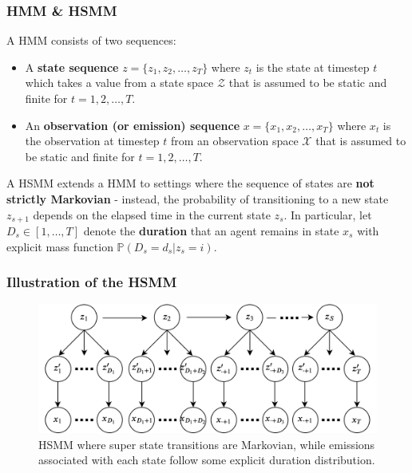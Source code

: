\documentclass{beamer}
\begin{document}
\begin{frame}
    \frametitle{HMM \& HSMM}
        A HMM consists of two sequences:
        \begin{itemize}
          \item A \textbf{state sequence} $z = \{z_1, z_2, \dots, z_T\}$ where $z_t$ is the state at timestep $t$ which takes a value from a state space $\mathcal{Z}$ that is assumed to be static and finite for $t = 1, 2, \dots, T$.
          \item An \textbf{observation (or emission) sequence} $x = \{x_1, x_2, \dots, x_T\}$ where $x_t$ is the observation at timestep $t$ from an observation space $\mathcal{X}$ that is assumed to be static and finite for $t = 1, 2, \dots, T$.
        \end{itemize}

        A HSMM extends a HMM to settings where the sequence of states are \textbf{not strictly Markovian} - instead, the probability of transitioning to a new state $z_{s+1}$ depends on the elapsed time in the current state $z_s$. In particular, let $D_s \in [1, \dots, T]$ denote the \textbf{duration} that an agent remains in state $x_s$ with explicit mass function $\mathbb{P}(D_s = d_s | z_s = i)$.
\end{frame}

\begin{frame}
    \frametitle{Illustration of the HSMM}
    \begin{figure}[H]
    \centering
    \includegraphics[scale=0.15]{images/hsmm2.png}
    \caption{HSMM where super state transitions are Markovian, while emissions associated with each state follow some explicit duration distribution.}
    \label{fig:hsmm}
    \end{figure}
\end{frame}
\end{document}
